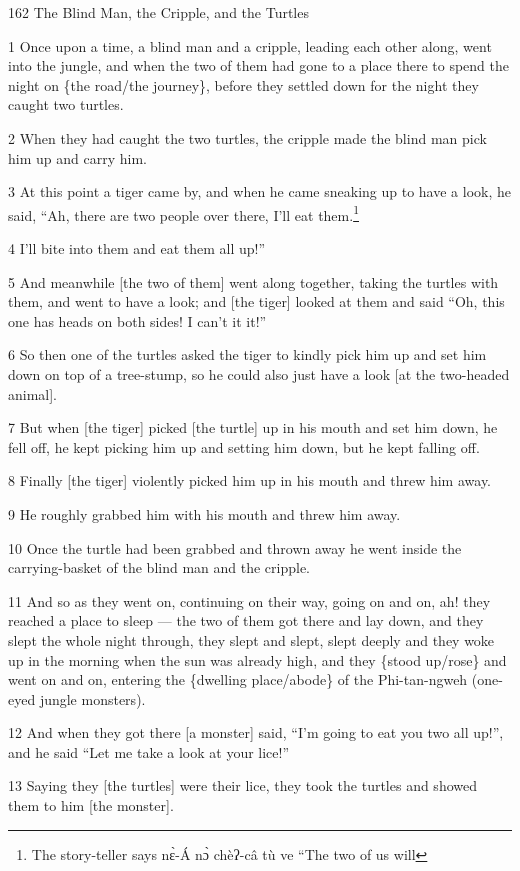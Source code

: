 
162 The Blind Man, the Cripple, and the Turtles

1 Once upon a time, a blind man and a cripple, leading each other along, went into
the jungle, and when the two of them had gone to a place there to spend the night
on \{the road/the journey\}, before they settled down for the night they caught
two turtles.

2 When they had caught the two turtles, the cripple made the blind man pick him
up and carry him.

3 At this point a tiger came by, and when he came sneaking up to have a look, he
said, ``Ah, there are two people over there, I'll eat them.\footnote{The story-teller says nɛ̀-Á nɔ̀ chèʔ-câ tù ve ``The two of us will}

4 I'll bite into them and eat them all up!''

5 And meanwhile [the two of them] went along together, taking the turtles with
them, and went to have a look; and [the tiger] looked at them and said ``Oh, this
one has heads on both sides! I can't it it!''

6 So then one of the turtles asked the tiger to kindly pick him up and set him
down on top of a tree-stump, so he could also just have a look [at the two-headed
animal].

7 But when [the tiger] picked [the turtle] up in his mouth and set him down, he
fell off, he kept picking him up and setting him down, but he kept falling off.

8 Finally [the tiger] violently picked him up in his mouth and threw him away.

9 He roughly grabbed him with his mouth and threw him away.

10 Once the turtle had been grabbed and thrown away he went inside the carrying-basket
of the blind man and the cripple.

11 And so as they went on, continuing on their way, going on and on, ah! they reached
a place to sleep --- the two of them got there and lay down, and they slept the
whole night through, they slept and slept, slept deeply and they woke up in the
morning when the sun was already high, and they \{stood up/rose\} and went on and
on, entering the \{dwelling place/abode\} of the Phi-tan-ngweh (one-eyed jungle
monsters).

12 And when they got there [a monster] said, ``I'm going to eat you two all up!'',
and he said ``Let me take a look at your lice!''

13 Saying they [the turtles] were their lice, they took the turtles and showed
them to him [the monster].

